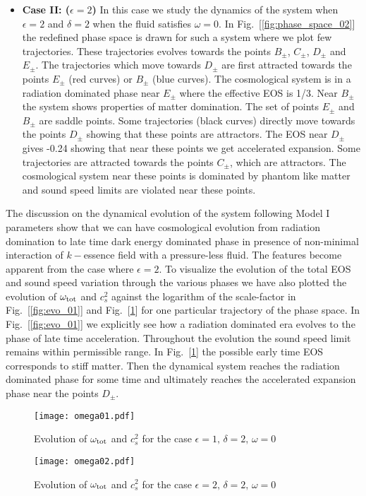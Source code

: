 \documentclass[a4paper,12pt]{article}
\begin{document}
\begin{itemize}
\item {\textbf{Case II: ($\epsilon = 2 $) }}\;  In this case we study the dynamics of the system when $\epsilon = 2$ and $\delta =2$ when the fluid satisfies $\omega =0$. In Fig.~[\ref{fig:phase_space_02}] the redefined phase space is drawn for such a system where we plot few trajectories.  These trajectories evolves towards the points $B_{\pm}$, $C_{\pm}$, $D_{\pm}$ and $E_\pm$.
The trajectories which move towards $D_{\pm}$ are first attracted towards the points $E_{\pm}$ (red curves) or $B_\pm$ (blue curves). The cosmological system is in a radiation dominated phase near $E_\pm$ where the effective EOS is 1/3.
Near $B_\pm$ the system shows properties of matter domination. The set of points $E_\pm$ and $B_\pm$ are saddle points. Some trajectories (black curves) directly move towards the points $D_\pm$ showing that these points are attractors. The EOS near $D_\pm$ gives -0.24 showing that near these points we get accelerated expansion. Some trajectories are attracted towards the points $C_\pm$, which are attractors. The cosmological system near these points is dominated by phantom like matter and sound speed limits are violated near these points.
\end{itemize}  
The discussion on the dynamical evolution of the system following Model I parameters show that we can have cosmological evolution from radiation domination to late time dark energy dominated phase in presence of non-minimal interaction of $k-$essence field with a pressure-less fluid. The features become apparent from  
the case where $\epsilon =2$. To visualize the evolution of the total EOS and sound speed variation through the various phases we have also plotted the evolution of $\omega_{\rm tot}$ and $c_{s}^2$ against the logarithm of the
scale-factor in Fig.~[\ref{fig:evo_01}]  and Fig.~[\ref{fig:evo_02}] for one particular trajectory of the phase space. In Fig.~[\ref{fig:evo_01}] we explicitly see how a radiation dominated era evolves to the phase of late time acceleration. Throughout the evolution the sound speed limit remains within permissible range. In Fig.~[\ref{fig:evo_02}] the possible early time EOS corresponds to stiff matter. Then the dynamical system reaches the radiation dominated phase for some time and ultimately reaches the accelerated expansion phase  near the points $D_{\pm}$.
\begin{figure}[t!]
\begin{minipage}[b]{0.5\linewidth}
\centering
\texttt{[image: omega01.pdf]}
\caption{Evolution of $\omega_{\rm tot}$ and $c_s^2$ for the case $\epsilon = 1,\, \delta =2,\, \omega = 0$} 
\label{fig:evo_01}
\end{minipage}
\hspace{0.2cm}
\begin{minipage}[b]{0.5\linewidth}
\centering
\texttt{[image: omega02.pdf]}
\caption{Evolution of $\omega_{\rm tot}$ and $c_s^2$ for the case $\epsilon = 2,\, \delta =2,\, \omega = 0$}
\label{fig:evo_02}
\end{minipage}
\end{figure}
\end{document}

